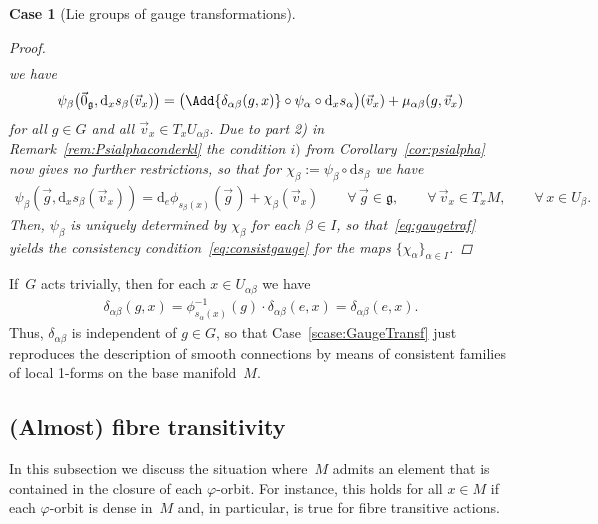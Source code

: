 \documentclass[pdftex]{sigma}
\numberwithin{equation}{section}
\newtheorem{scase}[Theorem]{Case}
{\theoremstyle{definition}
\newtheorem{Definition}[Theorem]{Definition}
\newtheorem{Convention}[Theorem]{Convention}
\newtheorem{Example}[Theorem]{Example}
\newtheorem{Remark}[Theorem]{Remark}
}
\begin{document}
\begin{scase}[Lie groups of gauge transformations]
\begin{proof}
\begin{gather*}
\end{gather*}
we have
\begin{gather}
\label{eq:gaugetraf}
\psi_\beta\big(\vec{0}_{\mathfrak{g}},\mathrm{d}_x s_\beta(\vec{v}_x)\big)=\big(\Add{\delta_{\alpha\beta}(g,x)} \circ
\psi_\alpha \circ \mathrm{d}_x s_{\alpha}\big)(\vec{v}_x)+\mu_{\alpha\beta}(g,\vec{v}_x)
\end{gather}
for all $g\in G$ and all $\vec{v}_x\in T_xU_{\alpha\beta}$.
Due to part 2)
in Remark~\ref{rem:Psialphaconderkl} the condition $i)$ from Corollary~\ref{cor:psialpha}
now gives no further restrictions, so that for $\chi_\beta:=\psi_\beta \circ \mathrm{d} s_\beta$ we have
\begin{gather*}
\psi_\beta(\vec{g}, \mathrm{d}_xs_\beta(\vec{v}_x))=\mathrm{d}_e\phi_{s_\beta(x)}(\vec{g}\hspace{1pt})+ \chi_\beta(\vec{v}_x)
\qquad\forall\, \vec{g}\in \mathfrak{g},
\qquad\forall\, \vec{v}_x\in T_xM,
\qquad\forall\, x\in U_\beta.
\end{gather*}
Then, $\psi_\beta$ is uniquely determined by $\chi_\beta$ for each $\beta\in I$, so that~\eqref{eq:gaugetraf} yields the
consistency condition~\eqref{eq:consistgauge} for the maps $\{\chi_\alpha\}_{\alpha\in I}$.
\end{proof}
\end{scase}
\begin{Example} If~$G$ acts trivially, then for each $x\in U_{\alpha\beta}$ we have
\begin{gather*}
\delta_{\alpha\beta}(g,x)=\phi_{s_\alpha(x)}^{-1}(g)\cdot \delta_{\alpha\beta}(e,x)=\delta_{\alpha\beta}(e,x).
\end{gather*}
Thus, $\delta_{\alpha\beta}$ is independent of $g\in G$, so that Case~\ref{scase:GaugeTransf} just reproduces the description of smooth connections by means of consistent families
of local 1-forms on the base manifold~$M$.
\end{Example}

\subsection{(Almost) fibre transitivity}%

In this subsection we discuss the situation where~$M$ admits an element that is contained in the closure of each
$\varphi$-orbit.
For instance, this holds for all $x\in M$ if each $\varphi$-orbit is dense in~$M$ and, in particular, is true for f\/ibre
transitive actions.
\end{document}
